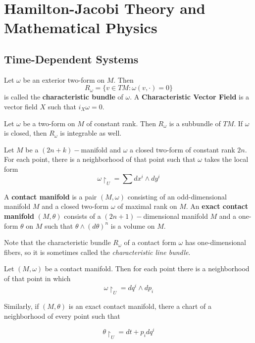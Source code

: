 

\section{Hamilton-Jacobi Theory and Mathematical Physics}
\subsection{Time-Dependent Systems}

\begin{defn}

Let $\omega$ be an exterior two-form on $M$. Then
\[R_{\omega}=\{v \in TM: \omega(v, \cdot) = 0 \}\]
is called the \textbf{characteristic bundle} of $\omega$. A \textbf{Characteristic Vector Field} is a vector field $X$ such that $i_X \omega=0$.

\end{defn}

\begin{prop}

Let $\omega$ be a two-form on $M$ of constant rank. Then $R_{\omega}$ is a subbundle of $TM$. If $\omega$ is closed, then $R_{\omega}$ is integrable as well.

\end{prop}

\begin{thm}[Darboux]

Let $M$ be a $(2n+k)-$manifold and $\omega$ a closed two-form of constant rank $2n$. For each point, there is a neighborhood of that point such that $\omega$ takes the local form
\[\omega \restriction_{U}= \sum dx^i \wedge dy^i\]

\end{thm}

\begin{defn}

A \textbf{contact manifold} is a pair $(M, \omega)$ consisting of an odd-dimensional manifold $M$ and a closed two-form $\omega$ of maximal rank on $M$. An \textbf{exact contact manifold} $(M,\theta)$ consists of a $(2n+1)-$dimensional manifold $M$ and a one-form $\theta$ on $M$ such that $\theta \wedge (d\theta)^n$ is a volume on $M$.

\end{defn}

Note that the characteristic bundle $R_{\omega}$ of a contact form $\omega$ has one-dimensional fibers, so it is sometimes called the \textit{characteristic line bundle}.

\begin{thm}

Let $(M,\omega)$ be a contact manifold. Then for each point there is a neighborhood of that point in which
\[
\omega \restriction_U = dq^i \wedge dp_i
\]

Similarly, if $(M,\theta)$ is an exact contact manifold, there a chart of a neighborhood of every point such that 

\[
\theta \restriction_U = dt + p_i dq^i
\]

\end{thm}


